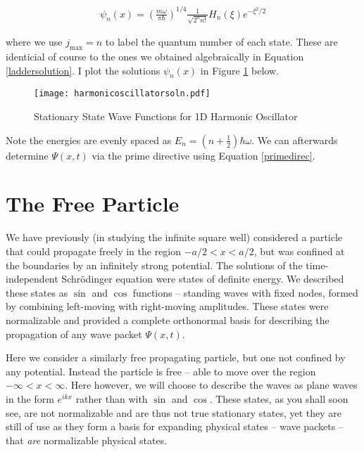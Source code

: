 \begin{align} \label{powerseriessoln}
  \psi_n(x) = \left( \frac{m\omega}{\pi \hbar}\right)^{1/4} \frac{1}{\sqrt{2^n
  n!}} H_n(\xi) e^{-\xi^2 / 2}
\end{align}\vspace{3px}

where we use $j_\text{max} = n$ to label the quantum number of each state. These are identicial of course to the ones we obtained algebraically in
Equation \ref{laddersolution}. I plot the solutions $\psi_n(x)$ in Figure
\ref{graphsoln} below. 

\begin{figure}[!ht]
  \centering
    \texttt{[image: harmonicoscillatorsoln.pdf]}
    \caption{Stationary State Wave Functions for 1D Harmonic Oscillator}
    \label{graphsoln}
\end{figure}

Note the energies are evenly spaced as $E_n = \left( n + \frac{1}{2} \right)
\hbar\omega $. We can afterwards determine $\Psi(x, t)$ via the prime
directive using Equation \ref{primedirec}. 

\section{The Free Particle}

We have previously (in studying the infinite square well) considered a particle
that could propagate freely in the region $-a/2 < x < a/2$, but was confined at
the boundaries by an infinitely strong potential. The solutions of the
time-independent Schr\"odinger equation were states of definite energy. We
described these states as $\sin$ and $\cos$ functions -- standing waves with
fixed nodes, formed by combining left-moving with right-moving amplitudes.
These states were normalizable and provided a complete orthonormal basis for
describing the propagation of any wave packet $\Psi(x, t)$. 

Here we consider a similarly free propagating particle, but one not confined by
any potential. Instead the particle is free -- able to move over the region
$-\infty < x < \infty$. Here however, we will choose to describe the waves as
plane waves in the form $e^{ikx}$ rather than with $\sin$ and $\cos$. These
states, as you shall soon see, are not normalizable and are thus not true
stationary states, yet they are still of use as they form a basis for expanding
physical states -- wave packets -- that \textit{are} normalizable physical
states. 

